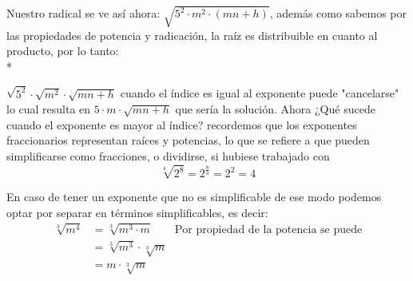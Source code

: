\documentclass[a4paper]{article}
\begin{document}
Nuestro radical se ve así ahora: $\sqrt{5^2\cdot m^2\cdot (mn+h)}$, además como sabemos por las propiedades de potencia y radicación, la raíz es distribuible en cuanto al producto, por lo tanto:\\*

$\sqrt{5^2}\cdot \sqrt{m^2} \cdot \sqrt{mn+h}$ cuando el índice es igual al exponente puede "cancelarse" lo cual resulta en $5\cdot m \cdot \sqrt{mn+h}$ que sería la solución. Ahora ¿Qué sucede cuando el exponente es mayor al índice? recordemos que los exponentes fraccionarios representan raíces y potencias, lo que se refiere a que pueden simplificarse como fracciones, o dividirse, si hubiese trabajado con 
\[
\sqrt[4]{2^8}=2^{\frac{8}{4}}=2^2=4
\]

En caso de tener un exponente que no es simplificable de ese modo podemos optar por separar en términos simplificables, es decir:
\begin{align*}
    \sqrt[3]{m^4} &= \sqrt[3]{m^3 \cdot m} \qquad \text{Por propiedad de la potencia se puede}\\
    &= \sqrt[3]{m^3} \cdot \sqrt[3]{m}\\
    &= m \cdot \sqrt[3]{m}
\end{align*}
\end{document}
